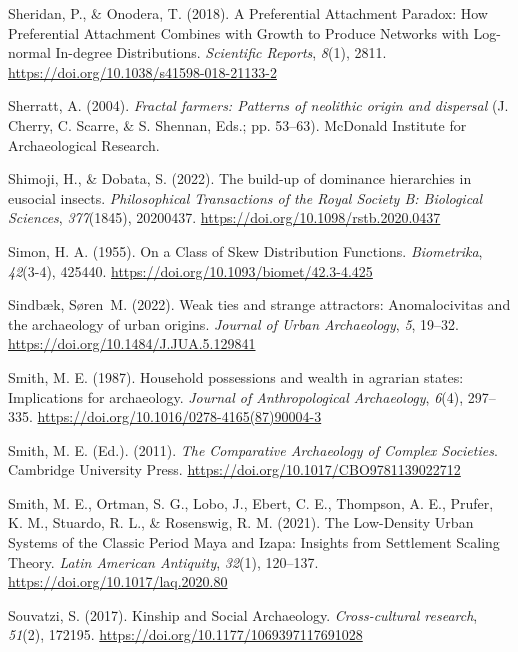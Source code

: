 \documentclass[
  12pt,
]{book}
\newlength{\cslhangindent}
\newlength{\cslentryspacingunit} %
\newenvironment{CSLReferences}[2] %
 {%
  \setlength{\parindent}{0pt}
  \ifodd #1
  \let\oldpar\par
  \def\par{\hangindent=\cslhangindent\oldpar}
  \fi
  \setlength{\parskip}{#2\cslentryspacingunit}
 }%
 {}
\begin{document}
\begin{CSLReferences}{1}{0}
\leavevmode{}%
Sheridan, P., \& Onodera, T. (2018). A Preferential Attachment Paradox: How Preferential Attachment Combines with Growth to Produce Networks with Log-normal In-degree Distributions. \emph{Scientific Reports}, \emph{8}(1), 2811. \url{https://doi.org/10.1038/s41598-018-21133-2}

\leavevmode{}%
Sherratt, A. (2004). \emph{Fractal farmers: Patterns of neolithic origin and dispersal} (J. Cherry, C. Scarre, \& S. Shennan, Eds.; pp. 53--63). McDonald Institute for Archaeological Research.

\leavevmode{}%
Shimoji, H., \& Dobata, S. (2022). The build-up of dominance hierarchies in eusocial insects. \emph{Philosophical Transactions of the Royal Society B: Biological Sciences}, \emph{377}(1845), 20200437. \url{https://doi.org/10.1098/rstb.2020.0437}

\leavevmode{}%
Simon, H. A. (1955). On a Class of Skew Distribution Functions. \emph{Biometrika}, \emph{42}(3-4), 425440. \url{https://doi.org/10.1093/biomet/42.3-4.425}

\leavevmode{}%
Sindbæk, Søren~M. (2022). Weak ties and strange attractors: Anomalocivitas and the archaeology of urban origins. \emph{Journal of Urban Archaeology}, \emph{5}, 19--32. \url{https://doi.org/10.1484/J.JUA.5.129841}

\leavevmode{}%
Smith, M. E. (1987). Household possessions and wealth in agrarian states: Implications for archaeology. \emph{Journal of Anthropological Archaeology}, \emph{6}(4), 297--335. \url{https://doi.org/10.1016/0278-4165(87)90004-3}

\leavevmode{}%
Smith, M. E. (Ed.). (2011). \emph{The Comparative Archaeology of Complex Societies}. Cambridge University Press. \url{https://doi.org/10.1017/CBO9781139022712}

\leavevmode{}%
Smith, M. E., Ortman, S. G., Lobo, J., Ebert, C. E., Thompson, A. E., Prufer, K. M., Stuardo, R. L., \& Rosenswig, R. M. (2021). The Low-Density Urban Systems of the Classic Period Maya and Izapa: Insights from Settlement Scaling Theory. \emph{Latin American Antiquity}, \emph{32}(1), 120--137. \url{https://doi.org/10.1017/laq.2020.80}

\leavevmode{}%
Souvatzi, S. (2017). Kinship and Social Archaeology. \emph{Cross-cultural research}, \emph{51}(2), 172195. \url{https://doi.org/10.1177/1069397117691028}


\end{CSLReferences}
\end{document}
